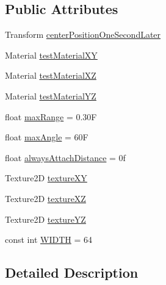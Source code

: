 \subsection*{Public Attributes}
\begin{DoxyCompactItemize}
\item 
Transform \mbox{\hyperlink{class_leap_1_1_unity_1_1_interaction_1_1_anchor_score_test_a0b653386407883193c56f11c169303c0}{center\+Position\+One\+Second\+Later}}
\item 
Material \mbox{\hyperlink{class_leap_1_1_unity_1_1_interaction_1_1_anchor_score_test_a5051bbea91c4f0e14597c2c10c0c9d48}{test\+Material\+XY}}
\item 
Material \mbox{\hyperlink{class_leap_1_1_unity_1_1_interaction_1_1_anchor_score_test_a906581781ede69149154a43b66230798}{test\+Material\+XZ}}
\item 
Material \mbox{\hyperlink{class_leap_1_1_unity_1_1_interaction_1_1_anchor_score_test_af7d30cdce1e83f66f1711784fc63e7f4}{test\+Material\+YZ}}
\item 
float \mbox{\hyperlink{class_leap_1_1_unity_1_1_interaction_1_1_anchor_score_test_a8126c9551302e6230814ef4158521806}{max\+Range}} = 0.\+30F
\item 
float \mbox{\hyperlink{class_leap_1_1_unity_1_1_interaction_1_1_anchor_score_test_a705981e80b0118ff7c79d5c7638306f1}{max\+Angle}} = 60F
\item 
float \mbox{\hyperlink{class_leap_1_1_unity_1_1_interaction_1_1_anchor_score_test_a6c720ce627151abd39ffed9b38a65216}{always\+Attach\+Distance}} = 0f
\item 
Texture2D \mbox{\hyperlink{class_leap_1_1_unity_1_1_interaction_1_1_anchor_score_test_af606e486a3342efdb4c31f41777e3ba5}{texture\+XY}}
\item 
Texture2D \mbox{\hyperlink{class_leap_1_1_unity_1_1_interaction_1_1_anchor_score_test_a9b9fcebd530451bf519f1f793ef9e165}{texture\+XZ}}
\item 
Texture2D \mbox{\hyperlink{class_leap_1_1_unity_1_1_interaction_1_1_anchor_score_test_acbb2721c96d37d8a95559ef9feb7111d}{texture\+YZ}}
\item 
const int \mbox{\hyperlink{class_leap_1_1_unity_1_1_interaction_1_1_anchor_score_test_a3442a284019dc4cce6865e30272220ed}{W\+I\+D\+TH}} = 64
\end{DoxyCompactItemize}


\subsection{Detailed Description}



